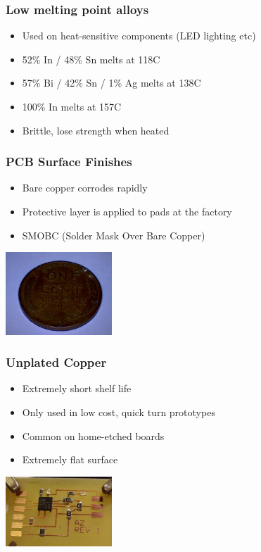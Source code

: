 \documentclass{beamer}
\begin{document}
\begin{frame}
\frametitle{Low melting point alloys}
\begin{itemize}
\item Used on heat-sensitive components (LED lighting etc)
\item 52\% In / 48\% Sn melts at 118C
\item 57\% Bi / 42\% Sn / 1\% Ag melts at 138C
\item 100\% In melts at 157C
\item Brittle, lose strength when heated
\end{itemize}
\end{frame}

\begin{frame}
\frametitle{PCB Surface Finishes}
\begin{itemize}
\item Bare copper corrodes rapidly
\item Protective layer is applied to pads at the factory
\item SMOBC (Solder Mask Over Bare Copper)
\end{itemize}
\begin{center}
\includegraphics[width=4cm,keepaspectratio]{oxidized-copper.jpg}
\end{center}
\end{frame}

\begin{frame}
\frametitle{Unplated Copper}
\begin{itemize}
\item Extremely short shelf life
\item Only used in low cost, quick turn prototypes
\item Common on home-etched boards
\item Extremely flat surface
\end{itemize}
\begin{center}
\includegraphics[width=4cm,keepaspectratio]{no-plating.jpg}
\end{center}
\end{frame}
\end{document}
